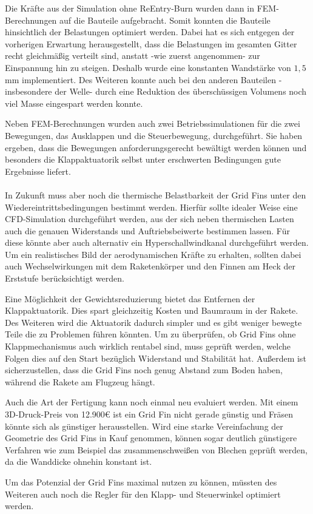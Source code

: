 Die Kräfte aus der Simulation ohne ReEntry-Burn wurden dann in FEM-Berechnungen auf die Bauteile aufgebracht. Somit konnten die Bauteile hinsichtlich der Belastungen optimiert werden. Dabei hat es sich entgegen der vorherigen Erwartung herausgestellt, dass die Belastungen im gesamten Gitter recht gleichmäßig verteilt sind, anstatt -wie zuerst angenommen- zur Einspannung hin zu steigen. Deshalb wurde eine konstanten Wandstärke von $1,5$ mm implementiert. Des Weiteren konnte auch bei den anderen Bauteilen -insbesondere der Welle- durch eine Reduktion des überschüssigen Volumens noch viel Masse eingespart werden konnte.

Neben FEM-Berechnungen wurden auch zwei Betriebssimulationen für die zwei Bewegungen, das Ausklappen und die Steuerbewegung, durchgeführt. Sie haben ergeben, dass die Bewegungen anforderungsgerecht bewältigt werden können und besonders die Klappaktuatorik selbst unter erschwerten Bedingungen gute Ergebnisse liefert. 
\\~\\
In Zukunft muss aber noch die thermische Belastbarkeit der Grid Fins unter den Wiedereintrittsbedingungen bestimmt werden. Hierfür sollte idealer Weise eine CFD-Simulation durchgeführt werden, aus der sich neben thermischen Lasten auch die genauen Widerstands und Auftriebsbeiwerte bestimmen lassen. Für diese könnte aber auch alternativ ein Hyperschallwindkanal durchgeführt werden. Um ein realistisches Bild der aerodynamischen Kräfte zu erhalten, sollten dabei auch Wechselwirkungen mit dem Raketenkörper und den Finnen am Heck der Erststufe berücksichtigt werden.

Eine Möglichkeit der Gewichtsreduzierung bietet das Entfernen der Klappaktuatorik. Dies spart gleichzeitig Kosten und Baumraum in der Rakete. Des Weiteren wird die Aktuatorik dadurch simpler und es gibt weniger bewegte Teile die zu Problemen führen könnten. Um zu überprüfen, ob Grid Fins ohne Klappmechanismus auch wirklich rentabel sind, muss geprüft werden, welche Folgen dies auf den Start bezüglich Widerstand und Stabilität hat. Außerdem ist sicherzustellen, dass die Grid Fins noch genug Abstand zum Boden haben, während die Rakete am Flugzeug hängt.

Auch die Art der Fertigung kann noch einmal neu evaluiert werden. Mit einem 3D-Druck-Preis von 12.900€ ist ein Grid Fin nicht gerade günstig und Fräsen könnte sich als günstiger herausstellen. Wird eine starke Vereinfachung der Geometrie des Grid Fins in Kauf genommen, können sogar deutlich günstigere Verfahren wie zum Beispiel das zusammenschweißen von Blechen geprüft werden, da die Wanddicke ohnehin konstant ist.

Um das Potenzial der Grid Fins maximal nutzen zu können, müssten des Weiteren auch noch die Regler für den Klapp- und Steuerwinkel optimiert werden.